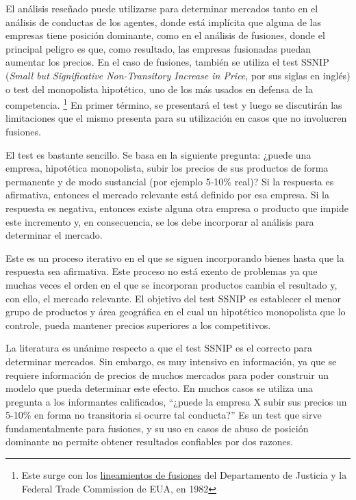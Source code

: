 \documentclass[
  12pt,
  spanish,
]{book}
\begin{document}
El análisis reseñado puede utilizarse para determinar mercados tanto en
el análisis de conductas de los agentes, donde está implícita que alguna
de las empresas tiene posición dominante, como en el análisis de
fusiones, donde el principal peligro es que, como resultado, las
empresas fusionadas puedan aumentar los precios. En el caso de fusiones,
también se utiliza el test SSNIP (\emph{Small but Significative
Non-Transitory Increase in Price}, por sus siglas en inglés) o test del
monopolista hipotético, uno de los más usados en defensa de la
competencia. \footnote{Este surge con los
  \href{https://www.justice.gov/archives/atr/1982-merger-guidelines}{lineamientos
  de fusiones} del Departamento de Justicia y la Federal Trade
  Commission de EUA, en 1982} En primer término, se presentará el test y
luego se discutirán las limitaciones que el mismo presenta para su
utilización en casos que no involucren fusiones.

El test es bastante sencillo. Se basa en la siguiente pregunta: ¿puede
una empresa, hipotética monopolista, subir los precios de sus productos
de forma permanente y de modo sustancial (por ejemplo 5-10\% real)? Si
la respuesta es afirmativa, entonces el mercado relevante está definido
por esa empresa. Si la respuesta es negativa, entonces existe alguna
otra empresa o producto que impide este incremento y, en consecuencia,
se los debe incorporar al análisis para determinar el mercado.

Este es un proceso iterativo en el que se siguen incorporando bienes
hasta que la respuesta sea afirmativa. Este proceso no está exento de
problemas ya que muchas veces el orden en el que se incorporan productos
cambia el resultado y, con ello, el mercado relevante. El objetivo del
test SSNIP es establecer el menor grupo de productos y área geográfica
en el cual un hipotético monopolista que lo controle, pueda mantener
precios superiores a los competitivos.

La literatura es unánime respecto a que el test SSNIP es el correcto
para determinar mercados. Sin embargo, es muy intensivo en información,
ya que se requiere información de precios de muchos mercados para poder
construir un modelo que pueda determinar este efecto. En muchos casos se
utiliza una pregunta a los informantes calificados, ``¿puede la empresa
X subir sus precios un 5-10\% en forma no transitoria si ocurre tal
conducta?'' Es un test que sirve fundamentalmente para fusiones, y su
uso en casos de abuso de posición dominante no permite obtener
resultados confiables por dos razones.
\end{document}
